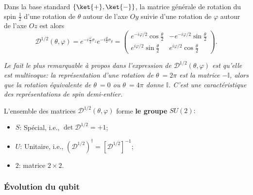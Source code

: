 Dans la base standard $\{\ket{+},\ket{-}\}$, la matrice générale de rotation du
spin $\frac{1}{2}$ d'une rotation de $\theta$ autour de l'axe $Oy$ suivie d'une
rotation de $\varphi$ autour de l'axe $Oz$ est alors
\begin{equation}
\mathcal{D}^{1/2}(\theta,\varphi)=e^{-i\frac{\varphi}{2}\sigma_z}e^{-i\frac{
\theta}{2}\sigma_{y}}=\begin{pmatrix}
e^{-i\varphi/2}\cos\frac{\theta}{2} & -e^{-i\varphi/2}\sin\frac{\theta}{2}\\
e^{i\varphi/2}\sin\frac{\theta}{2} &
e^{i\varphi/2}\cos\frac{\theta}{2}
\end{pmatrix}.
\end{equation}

\medskip\colorbox[gray]{0.8}{
\parbox[c]{0.9\textwidth}{
\emph{Le fait le plus remarquable à propos dans l'expression de
$\mathcal{D}^{1/2}(\theta,\varphi)$ est qu'elle est multivoque: la
représentation d'une rotation de $\theta\ =2\pi$ est la matrice $-\mathbb{I}$,
alors que la rotation équivalente de $\theta\ =0$ ou $\theta\ =4\pi$ donne
$\mathbb{I}$. C'est une caractéristique des représentations de spin
demi-entier.}
}}
\medskip

L'ensemble des matrices $\mathcal{D}^{1/2}(\theta,\varphi)$ forme \textbf{le
groupe} $SU(2):$

\begin{itemize}
\item $S$: Spécial, i.e., $\det\mathcal{D}^{1/2}=+1$;

\item $U$: Unitaire, i.e.,
$(\mathcal{D}^{1/2})^{\dagger}=[\mathcal{D}^{1/2}]^{-1}$;

\item $2$: matrice $2\times2$.
\end{itemize}

\subsubsection{Évolution du qubit}

